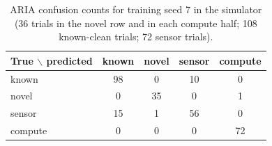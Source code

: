 \begin{table}[t]
\caption{ARIA confusion counts for training seed 7 in the simulator (36 trials in the novel row and in each compute half; 108 known-clean trials; 72 sensor trials).}
\label{tab:conf}
\centering
\small
\begin{tabular}{lcccc}
\toprule
True $\backslash$ predicted & known & novel & sensor & compute \\
\midrule
known & 98 & 0 & 10 & 0 \\
novel & 0 & 35 & 0 & 1 \\
sensor & 15 & 1 & 56 & 0 \\
compute & 0 & 0 & 0 & 72 \\
\bottomrule
\end{tabular}
\end{table}
